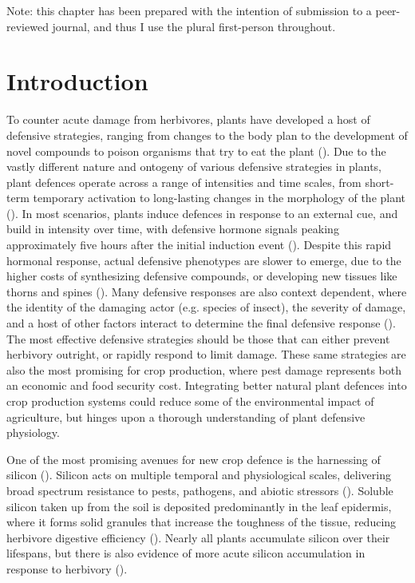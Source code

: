 \documentclass[12pt, letterpaper]{report}
\begin{document}
Note: this chapter has been prepared with the intention of submission to a peer-reviewed journal, and thus I use the plural first-person throughout.

\section{Introduction}

To counter acute damage from herbivores, plants have developed a host of defensive strategies, ranging from changes to the body plan to the development of novel compounds to poison organisms that try to eat the plant (\cite{agrawal_plant_2006}). Due to the vastly different nature and ontogeny of various defensive strategies in plants, plant defences operate across a range of intensities and time scales, from short-term temporary activation to long-lasting changes in the morphology of the plant (\cite{agrawal_plant_2006, karban_induced_1989}). In most scenarios, plants induce defences in response to an external cue, and build in intensity over time, with defensive hormone signals peaking approximately five hours after the initial induction event (\cite{schmelz_quantitative_2003}). Despite this rapid hormonal response, actual defensive phenotypes are slower to emerge, due to the higher costs of synthesizing defensive compounds, or developing new tissues like thorns and spines (\cite{karban_induced_1989}). Many defensive responses are also context dependent, where the identity of the damaging actor (e.g. species of insect), the severity of damage, and a host of other factors interact to determine the final defensive response (\cite{waterman_simulated_2019}). The most effective defensive strategies should be those that can either prevent herbivory outright, or rapidly respond to limit damage. These same strategies are also the most promising for crop production, where pest damage represents both an economic and food security cost. Integrating better natural plant defences into crop production systems could reduce some of the environmental impact of agriculture, but hinges upon a thorough understanding of plant defensive physiology.

One of the most promising avenues for new crop defence is the harnessing of silicon (\cite{reynolds_silicon_2016}). Silicon acts on multiple temporal and physiological scales, delivering broad spectrum resistance to pests, pathogens, and abiotic stressors (\cite{cooke_consistent_2016,coskun_controversies_2019}). Soluble silicon taken up from the soil is deposited predominantly in the leaf epidermis, where it forms solid granules that increase the toughness of the tissue, reducing herbivore digestive efficiency (\cite{cooke_is_2011}). Nearly all plants accumulate silicon over their lifespans, but there is also evidence of more acute silicon accumulation in response to herbivory (\cite{takahashi_possibility_1990}).
\end{document}
